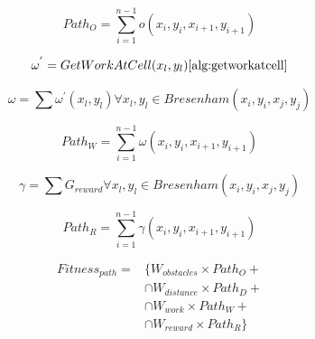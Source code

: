 \documentclass{tamuccthesis}
\begin{document}
\begin{equation}
Path_{O} = \sum_{i=1}^{n-1} o (x_{i}, y_{i}, x_{i+1}, y_{i+1})
\label{eq_path_obstacles}
\end{equation}

\begin{equation}
\omega^{'} = GetWorkAtCell(x_l, y_l) \ref{alg:getworkatcell}
\label{eq_work_prime}
\end{equation}

\begin{equation}
\omega = \sum \omega^{'}(x_l, y_l) \forall x_l, y_l \in Bresenham(x_i, y_i, x_j, y_j)
\label{eq_work}
\end{equation}

\begin{equation}
Path_{W} = \sum_{i=1}^{n-1} \omega (x_{i}, y_{i}, x_{i+1}, y_{i+1})
\label{eq_path_work}
\end{equation}

\begin{equation}
\gamma = \sum G_{reward} \forall x_l, y_l \in Bresenham(x_i, y_i, x_j, y_j)
\label{eq_reward}
\end{equation}

\begin{equation}
Path_{R} = \sum_{i=1}^{n-1} \gamma (x_{i}, y_{i}, x_{i+1}, y_{i+1})
\label{eq_path_reward}
\end{equation}


\begin{equation}
\begin{aligned}
Fitness_{path} ={} & \{W_{obstacles} \times Path_{O} + \\ 
                    & \cap W_{distance} \times Path_{D}  + \\
                    & \cap  W_{work} \times Path_{W}      + \\
                    & \cap W_{reward} \times Path_{R}\}
\end{aligned}
\label{fitness_function}
\end{equation}
\end{document}
